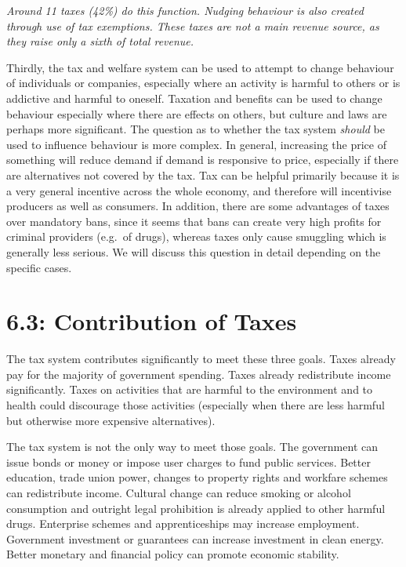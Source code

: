\documentclass[]{tufte-handout}
\begin{document}
\emph{Around 11 taxes (42\%) do this function. Nudging behaviour is also
created through use of tax exemptions. These taxes are not a main
revenue source, as they raise only a sixth of total revenue.}

Thirdly, the tax and welfare system can be used to attempt to change
behaviour of individuals or companies, especially where an activity is
harmful to others or is addictive and harmful to oneself. Taxation and
benefits can be used to change behaviour especially where there are
effects on others, but culture and laws are perhaps more significant.
The question as to whether the tax system \emph{should} be used to
influence behaviour is more complex. In general, increasing the price of
something will reduce demand if demand is responsive to price,
especially if there are alternatives not covered by the tax. Tax can be
helpful primarily because it is a very general incentive across the
whole economy, and therefore will incentivise producers as well as
consumers. In addition, there are some advantages of taxes over
mandatory bans, since it seems that bans can create very high profits
for criminal providers (e.g.~of drugs), whereas taxes only cause
smuggling which is generally less serious. We will discuss this question
in detail depending on the specific cases.

\hypertarget{contribution-of-taxes}{%
\section{6.3: Contribution of Taxes}\label{contribution-of-taxes}}

The tax system contributes significantly to meet these three goals.
Taxes already pay for the majority of government spending. Taxes already
redistribute income significantly. Taxes on activities that are harmful
to the environment and to health could discourage those activities
(especially when there are less harmful but otherwise more expensive
alternatives).

The tax system is not the only way to meet those goals. The government
can issue bonds or money or impose user charges to fund public services.
Better education, trade union power, changes to property rights and
workfare schemes can redistribute income. Cultural change can reduce
smoking or alcohol consumption and outright legal prohibition is already
applied to other harmful drugs. Enterprise schemes and apprenticeships
may increase employment. Government investment or guarantees can
increase investment in clean energy. Better monetary and financial
policy can promote economic stability.
\end{document}

